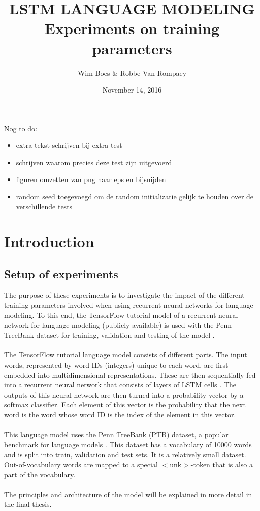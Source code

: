 \documentclass[10pt,a4paper,titlepage]{article}
\author{Wim Boes \& Robbe Van Rompaey}
\title{LSTM LANGUAGE MODELING\\Experiments on training parameters}
\date{November 14, 2016}
\begin{document}
\maketitle	

\setcounter{tocdepth}{2}
\tableofcontents

\newpage


Nog to do:
\begin{itemize}
\item extra tekst schrijven bij extra test
\item schrijven waarom precies deze test zijn uitgevoerd
\item figuren omzetten van png naar eps en bijsnijden
\item random seed toegevoegd om de random initializatie gelijk te houden over de verschillende tests
\end{itemize}

\section{Introduction}

\subsection{Setup of experiments}
\label{sec:setup}

The purpose of these experiments is to investigate the impact of the different training parameters involved when using recurrent neural networks for language modeling. To this end, the TensorFlow tutorial model of a recurrent neural network for language modeling (publicly available) is used with the Penn TreeBank dataset for training, validation and testing of the model \cite{tensorflow}.\\
\\
The TensorFlow tutorial language model consists of different parts. The input words, represented by word IDs (integers) unique to each word, are first embedded into multidimensional representations. These are then sequentially fed into a recurrent neural network that consists of layers of LSTM cells \cite{LSTM}. The outputs of this neural network are then turned into a probability vector by a softmax classifier. Each element of this vector is the probability that the next word is the word whose word ID is the index of the element in this vector.\\
\\
This language model uses the Penn TreeBank (PTB) dataset, a popular benchmark for language models \cite{PTB}. This dataset has a vocabulary of 10000 words and is split into train, validation and test sets. It is a relatively small dataset. Out-of-vocabulary words are mapped to a special $<$unk$>$-token that is also a part of the vocabulary.\\
\\
The principles and architecture of the model will be explained in more detail in the final thesis.
\end{document}
